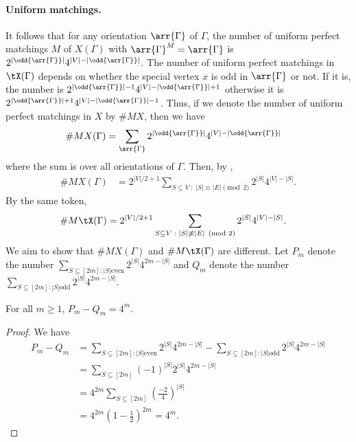 \documentclass{toc}
\begin{document}
\paragraph{Uniform matchings.}
It follows that for any orientation $\arr{\Gamma}$ of $\Gamma$, the number of uniform
perfect matchings $M$ of $X(\Gamma)$ with $\arr{\Gamma}^M = \arr{\Gamma}$ is
$2^{|\odd{\arr{\Gamma}}|}4^{|V|-|\odd{\arr{\Gamma}}|}$. The number of uniform perfect
matchings in $\tX(\Gamma)$ depends on whether the special vertex $x$ is odd in
$\arr{\Gamma}$ or not. If it is, the number is
$2^{|\odd{\arr{\Gamma}}|-1}4^{|V|-|\odd{\arr{\Gamma}}|+1}$ otherwise it is
$2^{|\odd{\arr{\Gamma}}|+1}4^{|V|-|\odd{\arr{\Gamma}}|-1}$. Thus, if we denote the number
of uniform perfect matchings in $X$ by $\# MX$, then we have
$$
\begin{aligned}
  \# M X(\Gamma) & = \sum_{\arr{\Gamma}} 2^{|\odd{\arr{\Gamma}}|}4^{|V|-|\odd{\arr{\Gamma}}|}
\end{aligned}
$$
where the sum is over all orientations of $\Gamma$. Then, by ,
$$
\begin{aligned}
  \# M X(\Gamma) & = 2^{|V|/2+1}\sum_{S\subseteq V \; : \; |S| \equiv |E| \pmod 2}
  2^{|S|}4^{|V|-|S|}.
\end{aligned}
$$
By the same token,
$$
\begin{aligned}
  \# M \tX(\Gamma) & = 2^{|V|/2+1}\sum_{S\subseteq V\; : \; |S| \not\equiv |E| \pmod
    2} 2^{|S|}4^{|V|-|S|}.
\end{aligned}
$$
We aim to show that $\# M X(\Gamma)$ and $\# M \tX(\Gamma)$ are different.  Let $P_m$
denote the number $\sum_{S\subseteq [2m] : |S| \text{even}} 2^{|S|}4^{2m-|S|}$
and $Q_m$ denote the number $\sum_{S\subseteq [2m] : |S| \text{odd}}
2^{|S|}4^{2m-|S|}$.
\begin{lemma}\label{lem:pandq}
  For all $m \geq 1$, $P_m - Q_m = 4^m$.
\end{lemma}
\begin{proof}
  We have
  \begin{align*}
    P_m - Q_m & = \sum_{S\subseteq [2m] : |S| \text{even}} 2^{|S|}4^{2m-|S|} - \sum_{S\subseteq [2m] : |S| \text{odd}} 2^{|S|}4^{2m-|S|} \\
              & = \sum_{S \subseteq [2m]} (-1)^{|S|} 2^{|S|}4^{2m-|S|} \\
              & = 4^{2m} \sum_{S \subseteq [2m]}(\frac{-2}{4})^{|S|} \\
    & = 4^{2m}(1-\frac{1}{2})^{2m} = 4^m.
  \end{align*}
  
\end{proof}
\end{document}
